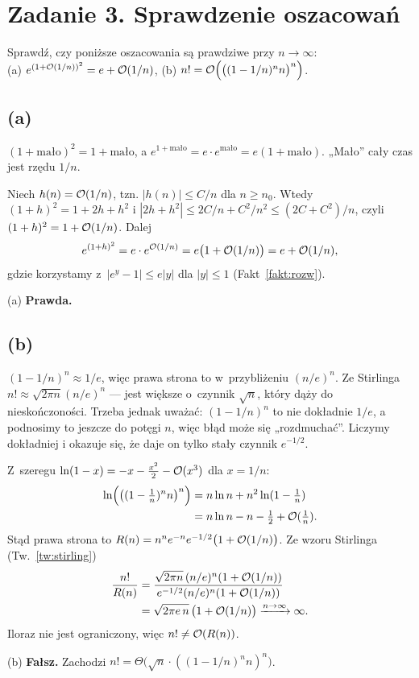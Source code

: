 \documentclass[11pt]{article}
\begin{document}
\section{Zadanie 3. Sprawdzenie oszacowań}
\begin{tresc}
Sprawdź, czy poniższe oszacowania są prawdziwe przy $n\to\infty$:\\
(a) $e^{(1+\mathcal{O}(1/n))^2} = e+\mathcal{O}(1/n)$,\qquad
(b) $n! = \mathcal{O}\Bigl(\bigl((1-1/n)^n n\bigr)^n\Bigr)$.
\end{tresc}

\subsection*{(a)}
\begin{intuicja}
$(1+\text{mało})^2 = 1+\text{mało}$, a $e^{1+\text{mało}} = e\cdot e^{\text{mało}}
= e(1+\text{mało})$. „Mało” cały czas jest rzędu $1/n$.
\end{intuicja}
\formalnie
Niech $h(n)=\mathcal{O}(1/n)$, tzn. $|h(n)|\le C/n$ dla $n\ge n_0$. Wtedy
$(1+h)^2 = 1 + 2h + h^2$ i $|2h+h^2|\le 2C/n + C^2/n^2\le (2C+C^2)/n$, czyli
$(1+h)^2 = 1+\mathcal{O}(1/n)$. Dalej
\[
e^{(1+h)^2} = e\cdot e^{\mathcal{O}(1/n)} = e\bigl(1+\mathcal{O}(1/n)\bigr) = e+\mathcal{O}(1/n),
\]
gdzie korzystamy z~$|e^y-1|\le e|y|$ dla $|y|\le1$ (Fakt~\ref{fakt:rozw}).
\begin{odpowiedz}
(a) \textbf{Prawda.}
\end{odpowiedz}

\subsection*{(b)}
\begin{intuicja}
$(1-1/n)^n\approx 1/e$, więc prawa strona to w~przybliżeniu $(n/e)^n$.
Ze Stirlinga $n!\approx\sqrt{2\pi n}(n/e)^n$ --- jest większe o~czynnik
$\sqrt n$, który dąży do nieskończoności. Trzeba jednak uważać:
$(1-1/n)^n$ to nie dokładnie $1/e$, a podnosimy to jeszcze do potęgi $n$,
więc błąd może się „rozdmuchać”. Liczymy dokładniej i okazuje się, że daje
on tylko stały czynnik $e^{-1/2}$.
\end{intuicja}
\formalnie
Z~szeregu $\ln(1-x) = -x-\frac{x^2}{2}-\mathcal{O}(x^3)$ dla $x=1/n$:
\begin{align*}
\ln\Bigl(\bigl((1-\tfrac1n)^n n\bigr)^n\Bigr) &= n\ln n + n^2\ln(1-\tfrac1n)\\
&= n\ln n - n - \tfrac12 + \mathcal{O}(\tfrac1n).
\end{align*}
Stąd prawa strona to $R(n) = n^n e^{-n} e^{-1/2}\bigl(1+\mathcal{O}(1/n)\bigr)$.
Ze wzoru Stirlinga (Tw.~\ref{tw:stirling})
\begin{align*}
\frac{n!}{R(n)} &= \frac{\sqrt{2\pi n}\,(n/e)^n(1+\mathcal{O}(1/n))}{e^{-1/2}(n/e)^n(1+\mathcal{O}(1/n))}\\
&= \sqrt{2\pi e\, n}\,\bigl(1+\mathcal{O}(1/n)\bigr)\xrightarrow{n\to\infty}\infty.
\end{align*}
Iloraz nie jest ograniczony, więc $n!\neq\mathcal{O}(R(n))$.
\begin{odpowiedz}
(b) \textbf{Fałsz.} Zachodzi $n!=\Theta\bigl(\sqrt n\cdot((1-1/n)^n n)^n\bigr)$.
\end{odpowiedz}
\end{document}
